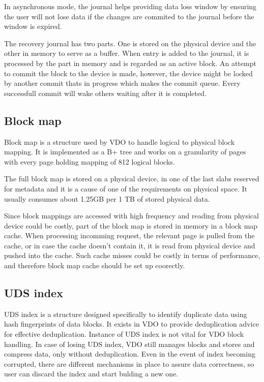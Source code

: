 \documentclass[
  color, %
  table, %
  lof,   %
  lot,   %
]{fithesis3}
\begin{document}
In asynchronous mode, the journal helps providing data loss window by ensuring the user will not lose data if the changes are commited to the journal before the window is expired.

The recovery journal has two parts. One is stored on the physical device and the other in memory to serve as a buffer. When entry is added to the journal, it is processed by the part in memory and is regarded as an active block. An attempt to commit the block to the device is made, however, the device might be locked by another commit thats in progress which makes the commit queue. Every successfull commit will wake others waiting after it is completed.


\subsection{Block map}
Block map is a structure used by VDO to handle logical to physical block mapping. It is implemented as a B+ tree and works on a granularity of pages with every page holding mapping of 812 logical blocks.

The full block map is stored on a physical device, in one of the last slabs reserved for metadata and it is a cause of one of the requirements on physical space. It usually consumes about 1.25GB per 1 TB of stored physical data.

Since block mappings are accessed with high frequency and reading from physical device could be costly, part of the block map is stored in memory in a block map cache. When processing incomming request, the relevant page is pulled from the cache, or in case the cache doesn't contain it, it is read from physical device and pushed into the cache. Such cache misses could be costly in terms of performance, and therefore block map cache should be set up coorectly.

\subsection{UDS index}
UDS index is a structure designed specifically to identify duplicate data using hash fingerprints of data blocks. It exists in VDO to provide deduplication advice for effective deduplication. Instance of UDS index is not vital for VDO block handling. In case of losing UDS index, VDO still manages blocks and stores and compress data, only without deduplication. Even in the event of index becoming corrupted, there are different mechanisms in place to assure data correctness, so user can discard the index and start bulding a new one.
\end{document}
